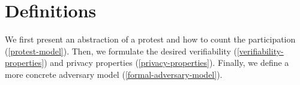 \section{Definitions}
We first present an abstraction of a protest and how to count the
participation (\cref{protest-model}). Then, we formulate the desired
verifiability (\cref{verifiability-properties}) and privacy properties
(\cref{privacy-properties}).
Finally, we define a more concrete adversary model 
(\cref{formal-adversary-model}).







